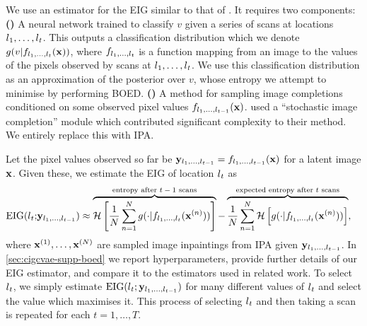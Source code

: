 We use an estimator for the EIG similar to that of \citet{harvey2019near}. It
requires two components:
\textbf{()} A neural network trained to classify $v$ given a series of
scans at locations $l{}_1,\ldots,l{}_t$. This outputs a classification distribution
which we denote $g(v|f_{l{}_1,\ldots,l{}_t}({\mathbf{x}}))$, where $f_{l{}_1,\ldots,l{}_t}$ is a
function mapping from an image to the values of the pixels observed by scans at
$l{}_1,\ldots,l{}_t$. We use this classification distribution as an approximation of
the posterior over $v$, whose entropy we attempt to minimise by performing BOED.
\textbf{()} A method for sampling image completions conditioned on some
observed pixel values $f_{l{}_1,\ldots,l{}_{t-1}}({\mathbf{x}})$. \citet{harvey2019near}
used a “stochastic image completion” module which contributed significant
complexity to their method. We entirely replace this with IPA.

Let the pixel values observed so far be ${\mathbf{y}}_{l{}_1,\ldots,l{}_{t-1}} =
f_{l{}_1,\ldots,l{}_{t-1}}({\mathbf{x}})$ for a latent image ${\mathbf{x}}$. Given these, we
estimate the EIG of location $l{}_t$ as
\begin{align}
  \label{eq:new-eig}
  \text{EIG}(l{}_t;& {\mathbf{y}}_{l{}_1,\ldots,l{}_{t-1}}) \approx \overbrace{\mathcal{H} \left[ \frac{1}{N} \sum_{n=1}^N g(\cdot|f_{l{}_1,\ldots,l{}_t}({\mathbf{x}}^{(n)})) \right]}^{\text{entropy after $t-1$ scans}} - \overbrace{\frac{1}{N} \sum_{n=1}^N  \mathcal{H} \left[ g(\cdot|f_{l{}_1,\ldots,l{}_t}({\mathbf{x}}^{(n)})) \right]}^{\text{expected entropy after $t$ scans}},
\end{align}
where ${\mathbf{x}}^{(1)},\ldots,{\mathbf{x}}^{(N)}$ are sampled image inpaintings from IPA
given ${\mathbf{y}}_{l{}_1,\ldots,l{}_{t-1}}$. In \cref{sec:cigcvae-supp-boed} we report
hyperparameters, provide further details of our EIG estimator, and compare it to
the estimators used in related work. To select $l{}_t$, we simply estimate
$\text{EIG}(l{}_t; {\mathbf{y}}_{l{}_1,\ldots,l{}_{t-1}})$ for many different values of
$l{}_t$ and select the value which maximises it. This process of selecting $l{}_t$
and then taking a scan is repeated for each $t=1,\ldots,T$.


